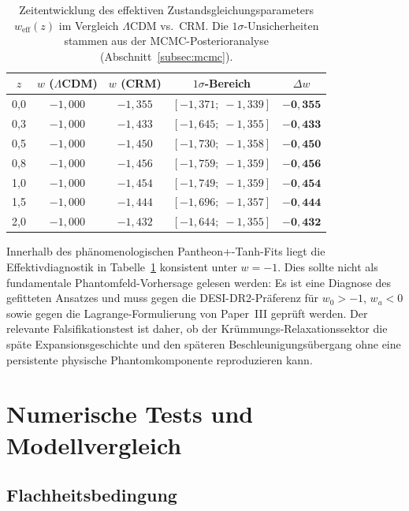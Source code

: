 \documentclass[aps,prd,twocolumn,superscriptaddress,nofootinbib]{revtex4-2}
\begin{document}
\begin{table}[H]
\centering
\caption{Zeitentwicklung des effektiven Zustandsgleichungsparameters $w_{\mathrm{eff}}(z)$ im Vergleich $\Lambda$CDM vs.\ CRM. Die $1\sigma$-Unsicherheiten stammen aus der MCMC-Posterioranalyse (Abschnitt~\ref{subsec:mcmc}).}
\label{tab:weff}
\begin{tabular}{ccccc}
\toprule
$z$ & $w$ ($\Lambda$CDM) & $w$ (CRM) & $1\sigma$-Bereich & $\Delta w$ \\
\midrule
0,0 & $-1{,}000$ & $-1{,}355$ & $[-1{,}371;\;-1{,}339]$ & $\mathbf{-0{,}355}$ \\
0,3 & $-1{,}000$ & $-1{,}433$ & $[-1{,}645;\;-1{,}355]$ & $\mathbf{-0{,}433}$ \\
0,5 & $-1{,}000$ & $-1{,}450$ & $[-1{,}730;\;-1{,}358]$ & $\mathbf{-0{,}450}$ \\
0,8 & $-1{,}000$ & $-1{,}456$ & $[-1{,}759;\;-1{,}359]$ & $\mathbf{-0{,}456}$ \\
1,0 & $-1{,}000$ & $-1{,}454$ & $[-1{,}749;\;-1{,}359]$ & $\mathbf{-0{,}454}$ \\
1,5 & $-1{,}000$ & $-1{,}444$ & $[-1{,}696;\;-1{,}357]$ & $\mathbf{-0{,}444}$ \\
2,0 & $-1{,}000$ & $-1{,}432$ & $[-1{,}644;\;-1{,}355]$ & $\mathbf{-0{,}432}$ \\
\bottomrule
\end{tabular}
\end{table}

Innerhalb des phänomenologischen Pantheon+-Tanh-Fits liegt die Effektivdiagnostik in Tabelle~\ref{tab:weff} konsistent unter $w=-1$. Dies sollte nicht als fundamentale Phantomfeld-Vorhersage gelesen werden: Es ist eine Diagnose des gefitteten Ansatzes und muss gegen die DESI-DR2-Präferenz für $w_0>-1$, $w_a<0$ sowie gegen die Lagrange-Formulierung von Paper~III geprüft werden. Der relevante Falsifikationstest ist daher, ob der Krümmungs-Relaxationssektor die späte Expansionsgeschichte und den späteren Beschleunigungsübergang ohne eine persistente physische Phantomkomponente reproduzieren kann.

\section{Numerische Tests und Modellvergleich}
\label{sec:numerics}

\subsection{Flachheitsbedingung}
\label{subsec:flatness}
\end{document}
